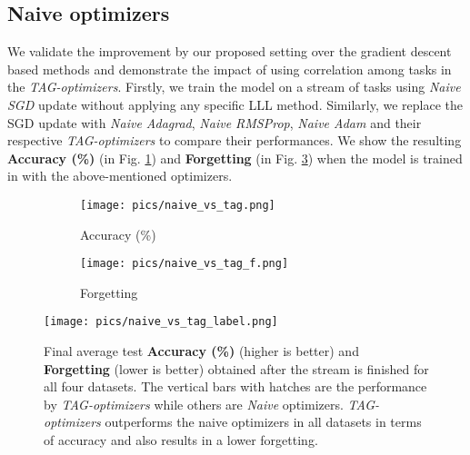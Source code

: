 \documentclass{article} \usepackage{collas2022_conference,times}
\begin{document}
\subsection{Naive optimizers}\label{naive_opt}



    We validate the improvement by our proposed setting over the gradient descent based methods and demonstrate the impact of using correlation among tasks in the \textit{TAG-optimizers}. Firstly, we train the model on a stream of tasks using \textit{Naive SGD} update without applying any specific LLL method. Similarly, we replace the SGD update with \textit{Naive Adagrad}, \textit{Naive RMSProp}, \textit{Naive Adam} and their respective \textit{TAG-optimizers} to compare their performances. We show the resulting \textbf{Accuracy (\%)} (in Fig. \ref{naive_acc_bar}) and \textbf{Forgetting} (in Fig. \ref{naive_forg_bar}) when the model is trained in with the above-mentioned optimizers. 



   \begin{figure}[h!]
        \centering
        \begin{subfigure}[b]{0.33\textwidth}
            \texttt{[image: pics/naive\_vs\_tag.png]}\caption{Accuracy (\%)}\label{naive_acc_bar}
        \end{subfigure}
        \begin{subfigure}[b]{0.33\textwidth}
            \texttt{[image: pics/naive\_vs\_tag\_f.png]}\caption{Forgetting}\label{naive_forg_bar}
        \end{subfigure}
        \texttt{[image: pics/naive\_vs\_tag\_label.png]}
        \caption{Final average test \textbf{Accuracy (\%)} (higher is better) and \textbf{Forgetting} (lower is better) obtained after the stream is finished for all four datasets. The vertical bars with hatches are the performance by \textit{TAG-optimizers} while others are \textit{Naive} optimizers. \textit{TAG-optimizers} outperforms the naive optimizers in all datasets in terms of accuracy and also results in a lower forgetting.}
       
    \end{figure}
\end{document}
